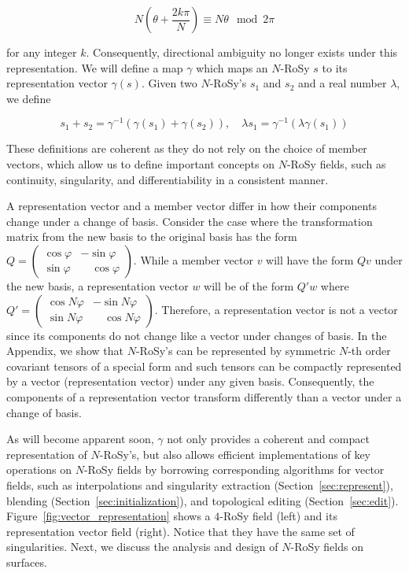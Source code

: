 \documentclass{acmsiggraph}               %
\begin{document}
\begin{equation}
N(\theta + \frac{2k\pi}{N}) \equiv N\theta \mod 2\pi
\end{equation}

\noindent for any integer $k$. Consequently, directional ambiguity
no longer exists under this representation. We will define a map
$\gamma$ which maps an $N$-RoSy $s$ to its representation vector
$\gamma(s)$. Given two $N$-RoSy's $s_1$ and $s_2$ and a real number
$\lambda$, we define

\begin{equation}
s_1+s_2 = \gamma^{-1}(\gamma(s_1)+\gamma(s_2)), \quad \lambda s_1 =
\gamma^{-1}(\lambda \gamma(s_1))
\end{equation}

\noindent These definitions are coherent as they do not rely on the
choice of member vectors, which allow us to define important
concepts on $N$-RoSy fields, such as continuity, singularity, and
differentiability in a consistent manner.

A representation vector and a member vector differ in how their
components change under a change of basis. Consider the case where
the transformation matrix from the new basis to the original basis
has the form $Q =
\begin{pmatrix} \cos\varphi & -\sin\varphi
\\ \sin\varphi & \quad \cos\varphi \end{pmatrix}$. While a member
vector $v$ will have the form $Qv$ under the new basis, a
representation vector $w$ will be of the form $Q'w$ where
$Q'=\begin{pmatrix} \cos N\varphi & -\sin N\varphi \\ \sin N\varphi
& \quad \cos N\varphi \end{pmatrix}$. Therefore, a representation
vector is not a vector since its components do not change like a
vector under changes of basis. In the Appendix, we show that
$N$-RoSy's can be represented by symmetric $N$-th order covariant
tensors of a special form and such tensors can be compactly
represented by a vector (representation vector) under any given
basis. Consequently, the components of a representation vector
transform differently than a vector under a change of basis.

As will become apparent soon, $\gamma$ not only provides a coherent
and compact representation of $N$-RoSy's, but also allows efficient
implementations of key operations on $N$-RoSy fields by borrowing
corresponding algorithms for vector fields, such as interpolations
and singularity extraction (Section~\ref{sec:represent}), blending
(Section~\ref{sec:initialization}), and topological editing
(Section~\ref{sec:edit}). Figure~\ref{fig:vector_representation}
shows a $4$-RoSy field (left) and its representation vector field
(right). Notice that they have the same set of singularities. Next,
we discuss the analysis and design of $N$-RoSy fields on surfaces.
\end{document}
